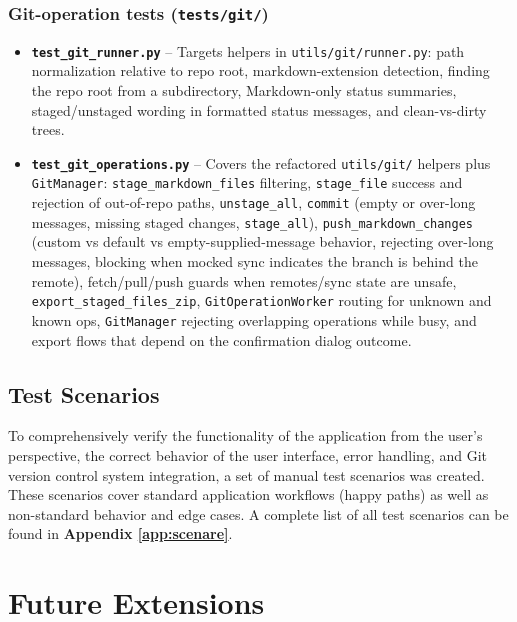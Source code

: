 \documentclass[12pt, a4paper]{article}
\begin{document}
\subsubsection*{Git-operation tests (\texttt{tests/git/})}

\begin{itemize}
    \item \textbf{\texttt{test\_git\_runner.py}} --
    Targets helpers in \texttt{utils/git/runner.py}: path normalization relative to repo root,
    markdown-extension detection, finding the repo root from a subdirectory,
    Markdown-only status summaries, staged/unstaged wording in formatted status messages, and clean-vs-dirty trees.

    \item \textbf{\texttt{test\_git\_operations.py}} --
    Covers the refactored \texttt{utils/git/} helpers plus \texttt{GitManager}: 
    \texttt{stage\_markdown\_files} filtering, \texttt{stage\_file} success and rejection of out-of-repo paths,
    \texttt{unstage\_all}, 
    \texttt{commit} (empty or over-long messages, missing staged changes, \texttt{stage\_all}), 
    \texttt{push\_markdown\_changes} (custom vs default vs empty-supplied-message behavior, rejecting over-long messages,
    blocking when mocked sync indicates the branch is behind the remote), fetch/pull/push guards when remotes/sync state are unsafe,
    \texttt{export\_staged\_files\_zip}, \texttt{GitOperationWorker} routing for unknown and known ops,
    \texttt{GitManager} rejecting overlapping operations while busy, 
    and export flows that depend on the confirmation dialog outcome.
\end{itemize}

\subsection{Test Scenarios}

To comprehensively verify the functionality of the application from the user's perspective, the correct 
behavior of the user interface, error handling, and Git version control system integration, a set of 
manual test scenarios was created. These scenarios cover standard application workflows (happy paths)
as well as non-standard behavior and edge cases. A complete list of all test scenarios can be found in 
\textbf{Appendix \ref{app:scenare}}.

\section{Future Extensions}
\end{document}
